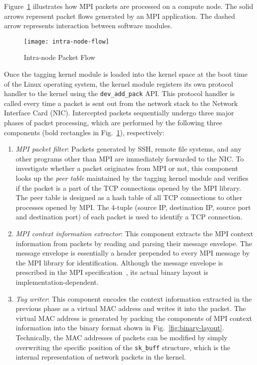 Figure~\ref{fig:intra-node-flow} illustrates how MPI packets are
processed on a compute node. The solid arrows represent packet flows
generated by an MPI application. The dashed arrow represents interaction
between software modules.

\begin{figure}
    \centering
    \texttt{[image: intra-node-flow]}
    \caption{Intra-node Packet Flow}%
    \label{fig:intra-node-flow}
\end{figure}

Once the tagging kernel module is loaded into the kernel space at the
boot time of the Linux operating system, the kernel module registers its
own protocol handler to the kernel using the
\lstinline!dev_add_pack! API\@. This protocol handler is
called every time a packet is sent out from the network stack to the
Network Interface Card (NIC). Intercepted packets sequentially undergo
three major phases of packet processing, which are performed by the
following three components (bold rectangles in
Fig.~\ref{fig:intra-node-flow}), respectively:

\begin{enumerate}
\def\labelenumi{\arabic{enumi}.}
\item
  \emph{MPI packet filter}: Packets generated by SSH, remote file
  systems, and any other programs other than MPI are immediately forwarded to
  the NIC\@. To investigate whether a packet originates from MPI or not,
  this component looks up the \emph{peer table} maintained by the
  tagging kernel module and verifies if the packet is a part of the TCP
  connections opened by the MPI library. The peer table is designed as a
  hash table of all TCP connections to other processes opened by MPI\@.
  The 4-tuple (source IP, destination IP, source port and destination
  port) of each packet is used to identify a TCP connection.
\item
  \emph{MPI context information extractor}: This component extracts the
  MPI context information from packets by reading and parsing their
  message envelope. The message envelope is essentially a header
  prepended to every MPI message by the MPI library for identification.
  Although the message envelope is prescribed in the MPI
  specification~\autocite{MessagePassingInterfaceForum2015}, its actual binary
  layout is implementation-dependent.
\item
  \emph{Tag writer}: This component encodes the context information
  extracted in the previous phase as a virtual MAC address and writes it
  into the packet. The virtual MAC address is generated by packing the
  components of MPI context information into the binary format shown in
  Fig.~\ref{fig:binary-layout}. Technically, the MAC addresses of
  packets can be modified by simply overwriting the specific position of
  the \lstinline!sk_buff! structure, which is the
  internal representation of network packets in the kernel.
\end{enumerate}

